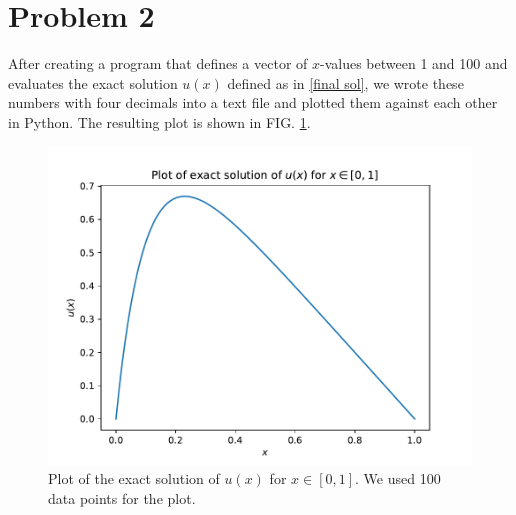 \documentclass[english,notitlepage]{revtex4-1}  %
\begin{document}
\section*{Problem 2}
After creating a program that defines a vector of $x$-values between 1 and 100 and evaluates the exact solution $u(x)$ defined as in \eqref{final sol}, we wrote these numbers with four decimals into a text file and plotted them against each other in Python. The resulting plot is shown in FIG. \ref{plot_problem2}.
\begin{figure}[h!]
    \centering 
    \includegraphics[scale=0.80]{plot_problem2.pdf} %
    \caption{Plot of the exact solution of $u(x)$ for $x\in [0,1]$. We used 100 data points for the plot.}
    \label{plot_problem2}
\end{figure}
\end{document}
